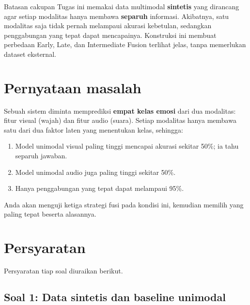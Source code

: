 \documentclass[12pt, a4paper]{article}
\begin{document}
\begin{minipage}{\linewidth}
\begin{bclogo}[couleur=ctpMantle, arrondi=0.1, logo=\bcinfo, ombre=false, couleurBord=ctpSurface, epBord=0.6]{Batasan cakupan}
  Tugas ini memakai data multimodal \textbf{sintetis} yang dirancang agar setiap modalitas
  hanya membawa \textbf{separuh} informasi. Akibatnya, satu modalitas saja tidak pernah
  melampaui akurasi kebetulan, sedangkan penggabungan yang tepat dapat mencapainya.
  Konstruksi ini membuat perbedaan Early, Late, dan Intermediate Fusion terlihat jelas,
  tanpa memerlukan dataset eksternal.
\end{bclogo}
\end{minipage}

\section{Pernyataan masalah}\label{sec:intro}

Sebuah sistem diminta memprediksi \textbf{empat kelas emosi} dari dua modalitas: fitur
visual (wajah) dan fitur audio (suara). Setiap modalitas hanya membawa satu dari dua
faktor laten yang menentukan kelas, sehingga:

\begin{enumerate}
  \item Model unimodal visual paling tinggi mencapai akurasi sekitar 50\%; ia tahu separuh jawaban.
  \item Model unimodal audio juga paling tinggi sekitar 50\%.
  \item Hanya penggabungan yang tepat dapat melampaui 95\%.
\end{enumerate}

Anda akan menguji ketiga strategi fusi pada kondisi ini, kemudian memilih yang paling
tepat beserta alasannya.

\section{Persyaratan}\label{sec:requirements}

Persyaratan tiap soal diuraikan berikut.

\subsection{Soal 1: Data sintetis dan baseline unimodal}
\label{sec:soal1}
\end{document}
